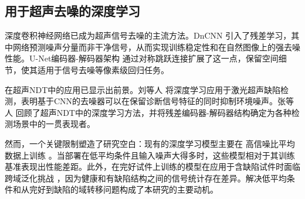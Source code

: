 \subsection{用于超声去噪的深度学习}
\label{sec:deep-learning}

深度卷积神经网络已成为超声信号去噪的主流方法。DnCNN \cite{zhang2017denoising} 引入了残差学习，其中网络预测噪声分量而非干净信号，从而实现训练稳定性和在自然图像上的强去噪性能。U-Net编码器-解码器架构 \cite{ronneberger2015unet} 通过对称跳跃连接扩展了这一点，保留空间细节，使其适用于信号去噪等像素级回归任务。

在超声NDT中的应用已显示出前景。刘等人 \cite{liu2022deep} 将深度学习应用于激光超声缺陷检测，表明基于CNN的去噪器可以在保留诊断信号特征的同时抑制环境噪声。张等人 \cite{zhang2020deep} 回顾了超声NDT中的深度学习方法，并将残差编码器-解码器结构确定为各种检测场景中的一贯表现者。

然而，一个关键限制塑造了研究空白：现有的深度学习模型主要在 高信噪比平均数据上训练 \cite{liu2022deep, zhang2020deep}。当部署在低平均条件且输入噪声大得多时，这些模型相对于其训练基准表现出性能差距。此外，在完好试件上训练的模型在应用于含缺陷试件时面临跨域泛化挑战 \cite{liu2022deep}，因为健康和有缺陷结构之间的信号统计存在差异。解决低平均条件和从完好到缺陷的域转移问题构成了本研究的主要动机。
